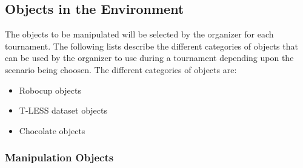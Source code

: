

\subsection{Objects in the Environment}
\label{ssec:Objects}

The objects to be manipulated will be selected by the organizer for each tournament.
The following lists describe the different categories of objects that can be used by
the organizer to use during a tournament depending upon the scenario being choosen.
The different categories of objects are:
%
\begin{itemize}
\item Robocup objects 
\item T-LESS dataset objects
\item Chocolate objects
\end{itemize} 
%

\subsubsection{Manipulation Objects}
\label{sssec:PartstoManipulate}
\newcommand*{\ObjectTablePartsImageScale}{0.12\textwidth}

